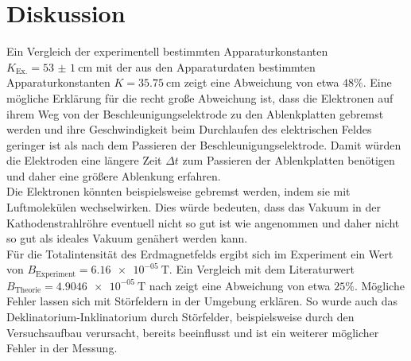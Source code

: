 \section{Diskussion}
\label{sec:Diskussion}
Ein Vergleich der experimentell bestimmten Apparaturkonstanten $K_\mathrm{Ex.}=\SI{53(1)}{\centi\meter}$ mit der aus den Apparaturdaten bestimmten Apparaturkonstanten $K=\SI{35.75}{\centi\meter}$ zeigt eine Abweichung von etwa $48\%$. Eine mögliche Erklärung für die recht große Abweichung ist, dass die Elektronen auf ihrem Weg von der Beschleunigungselektrode zu den Ablenkplatten gebremst werden und ihre Geschwindigkeit beim Durchlaufen des elektrischen Feldes geringer ist als nach dem Passieren der Beschleunigungselektrode. Damit würden die Elektroden eine längere Zeit $\Delta t$ zum Passieren der Ablenkplatten benötigen und daher eine größere Ablenkung erfahren.\\
Die Elektronen könnten beispielsweise gebremst werden, indem sie mit Luftmolekülen wechselwirken. Dies würde bedeuten, dass das Vakuum in der Kathodenstrahlröhre eventuell nicht so gut ist wie angenommen und daher nicht so gut als ideales Vakuum genähert werden kann.
\\Für die Totalintensität des Erdmagnetfelds ergibt sich im Experiment ein Wert von $B_\mathrm{Experiment}=\SI{6.16e-05}{\tesla}$. Ein Vergleich mit dem Literaturwert $B_\mathrm{Theorie}=\SI{4.9046e-05}{\tesla}$ nach \cite{bob} zeigt eine Abweichung von etwa $25\%$. Mögliche Fehler lassen sich mit Störfeldern in der Umgebung erklären. So wurde auch das Deklinatorium-Inklinatorium durch Störfelder, beispielsweise durch den Versuchsaufbau verursacht, bereits beeinflusst und ist ein weiterer möglicher Fehler in der Messung.
